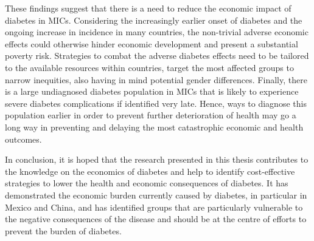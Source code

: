 These findings suggest that there is a need to reduce the economic impact of diabetes in \acp{MIC}. Considering the increasingly earlier onset of diabetes and the ongoing increase in incidence in many countries, the non-trivial adverse economic effects could otherwise hinder economic development and present a substantial poverty risk. Strategies to combat the adverse diabetes effects need to be tailored to the available resources within countries, target the most affected groups to narrow inequities, also having in mind potential gender differences. Finally, there is a large undiagnosed diabetes population in \acp{MIC} that is likely to experience severe diabetes complications if identified very late. Hence, ways to diagnose this population earlier in order to prevent further deterioration of health may go a long way in preventing and delaying the most catastrophic economic and health outcomes.

In conclusion, it is hoped that the research presented in this thesis contributes to the knowledge on the economics of diabetes and help to identify cost-effective strategies to lower the health and economic consequences of diabetes. It has demonstrated the economic burden currently caused by diabetes, in particular in Mexico and China, and has identified groups that are particularly vulnerable to the negative consequences of the disease and should be at the centre of efforts to prevent the burden of diabetes.